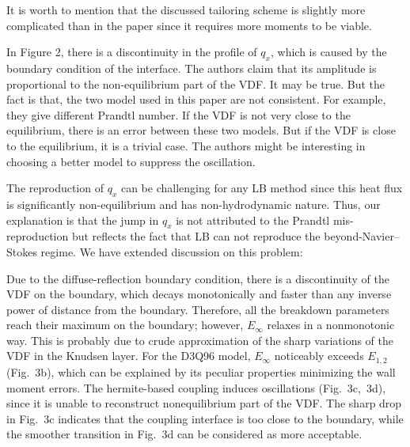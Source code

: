 \documentclass{article}
\begin{document}
It is worth to mention that the discussed tailoring scheme is slightly more complicated than in the paper
since it requires more moments to be viable.

\begin{quoting}
    In Figure 2, there is a discontinuity in the profile of \(q_x\), which is caused by the boundary condition of the interface.
    The authors claim that its amplitude is proportional to the non-equilibrium part of the VDF. It may be true.
    But the fact is that, the two model used in this paper are not consistent.
    For example, they give different Prandtl number.
    If the VDF is not very close to the equilibrium, there is an error between these two models.
    But if the VDF is close to the equilibrium, it is a trivial case.
    The authors might be interesting in choosing a better model to suppress the oscillation.
\end{quoting}

The reproduction of \(q_x\) can be challenging for any LB method
since this heat flux is significantly non-equilibrium and has non-hydrodynamic nature.
Thus, our explanation is that the jump in \(q_x\) is not attributed to the Prandtl mis-reproduction
but reflects the fact that LB can not reproduce the beyond-Navier--Stokes regime.
We have extended discussion on this problem:

\begin{leftbar}
    Due to the diffuse-reflection boundary condition, there is a discontinuity of the VDF on the boundary,
    which decays monotonically and faster than any inverse power of distance from the boundary.
    Therefore, all the breakdown parameters reach their maximum on the boundary;
    however, \(E_\infty\) relaxes in a nonmonotonic way.
    This is probably due to crude approximation of the sharp variations of the VDF in the Knudsen layer.
    For the D3Q96 model, \(E_\infty\) noticeably exceeds \(E_{1,2}\) (Fig.~3b),
    which can be explained by its peculiar properties minimizing the wall moment errors.
    The hermite-based coupling induces oscillations (Fig.~3c,~3d),
    since it is unable to reconstruct nonequilibrium part of the VDF.
    The sharp drop in Fig.~3c indicates that the coupling interface is too close to the boundary,
    while the smoother transition in Fig.~3d can be considered as more acceptable.
\end{leftbar}

\printbibliography
\end{document}
